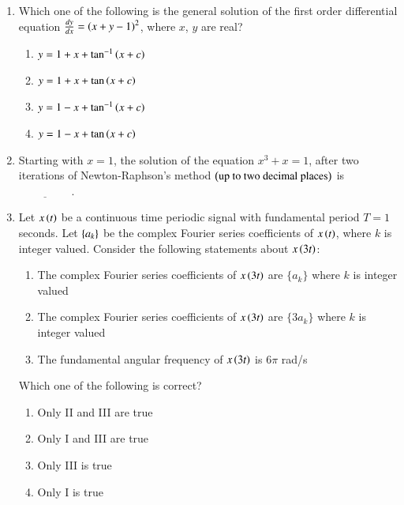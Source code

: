 \documentclass[journal,12pt,onecolumn]{IEEEtran}
\theoremstyle{remark}
\begin{document}
\begin{enumerate}
\hfill {}

\item Which one of the following is the general solution of the first order differential equation $\frac{dy}{dx} = \left(x + y - 1\right)^2$, where $x$, $y$ are real?
\begin{multicols}{2}
\begin{enumerate}
\item $y = 1 + x + \tan^{-1}\left(x+c\right)$
\item $y = 1 + x + \tan\left(x+c\right)$
\item $y = 1 - x + \tan^{-1}\left(x+c\right)$
\item $y = 1 - x + \tan\left(x+c\right)$
\end{enumerate}
\end{multicols}
\hfill {}

\item Starting with $x = 1$, the solution of the equation $x^3 + x = 1$, after two iterations of Newton-Raphson's method $\left(\text{up to two decimal places}\right)$ is $\underline{\hspace{2cm}}$.

\hfill {}

\item Let $x\left(t\right)$ be a continuous time periodic signal with fundamental period $T = 1$ seconds. Let $\left\{a_k\right\}$ be the complex Fourier series coefficients of $x\left(t\right)$, where $k$ is integer valued. Consider the following statements about $x\left(3t\right)$:  
\begin{enumerate}[label=\Roman*.]
    \item The complex Fourier series coefficients of $x\left(3t\right)$ are $\{a_k\}$ where $k$ is integer valued 
    \item The complex Fourier series coefficients of $x\left(3t\right)$ are $\{3a_k\}$ where $k$ is integer valued
    \item The fundamental angular frequency of $x\left(3t\right)$ is $6\pi$ rad/s 
\end{enumerate}
Which one of the following is correct?  
\begin{multicols}{2}
\begin{enumerate}
\item Only II and III are true
\item Only I and III are true
\item Only III is true
\item Only I is true
\end{enumerate}
\end{multicols}
\hfill {}


\end{enumerate}
\end{document}
